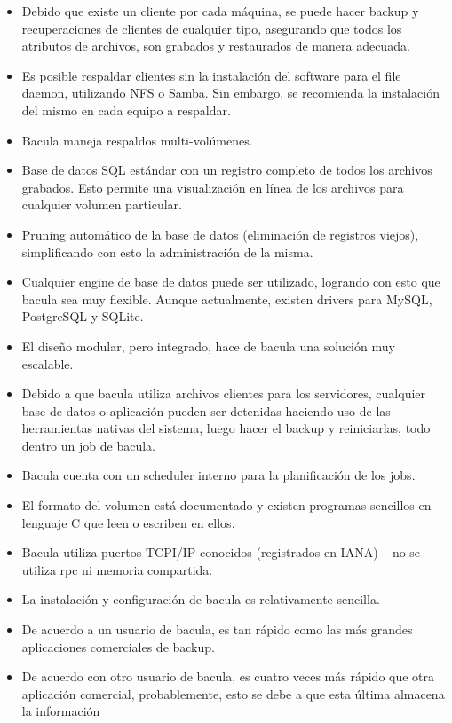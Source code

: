 \begin{itemize}
\item Debido que existe un cliente por cada máquina, se puede hacer backup y recuperaciones
   de clientes de cualquier tipo, asegurando que todos los atributos de archivos, son
   grabados y restaurados de manera adecuada.
\item Es posible respaldar clientes sin la instalación del software para el file daemon,
   utilizando NFS o Samba. Sin embargo, se recomienda la instalación del mismo en cada
   equipo a respaldar.
\item Bacula maneja respaldos multi-volúmenes.  
\item Base de datos SQL estándar con un registro completo de todos los archivos grabados.
   Esto permite una visualización en línea de los archivos para cualquier volumen particular.  
\item Pruning automático de la base de datos (eliminación de registros viejos), simplificando 
   con esto la administración de la misma.  
\item Cualquier engine de base de datos puede ser utilizado, logrando con esto que bacula  
      sea muy flexible. Aunque actualmente, existen drivers para MySQL, PostgreSQL y SQLite.
\item El diseño modular, pero integrado, hace de bacula una solución muy escalable.  
\item Debido a que bacula utiliza archivos clientes para los servidores, cualquier base
   de datos o aplicación pueden ser detenidas haciendo uso de las herramientas nativas
   del sistema, luego hacer el backup y reiniciarlas, todo dentro un job de bacula.
\item Bacula cuenta con un scheduler interno para la planificación de los jobs.  
\item El formato del volumen está documentado y existen programas sencillos en lenguaje 
   C que leen o escriben en ellos.  
\item Bacula utiliza puertos TCPI/IP conocidos (registrados en IANA) -- no se utiliza rpc
   ni memoria compartida.  
\item La instalación y configuración de bacula es relativamente sencilla.
\item De acuerdo a un usuario de bacula, es tan rápido como las más grandes aplicaciones
   comerciales de backup.  
\item De acuerdo con otro usuario de bacula, es cuatro veces más rápido que otra aplicación
   comercial, probablemente, esto se debe a que esta última almacena la información

\end{itemize}
